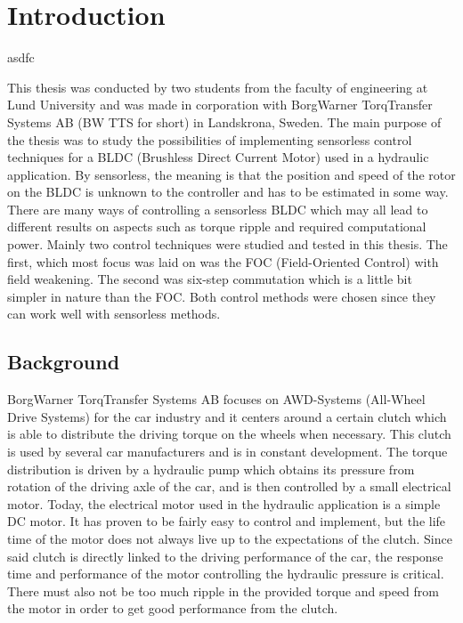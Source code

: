 \documentclass{LTHthesis}
\begin{document}
\chapter{Introduction}
asdfc

This thesis was conducted by two students from the faculty of engineering at Lund University and was made in corporation with BorgWarner TorqTransfer Systems AB (BW TTS for short) in Landskrona, Sweden. The main purpose of the thesis was to study the possibilities of implementing sensorless control techniques for a BLDC (Brushless Direct Current Motor) used in a hydraulic application. By sensorless, the meaning is that the position and speed of the rotor on the BLDC is unknown to the controller and has to be estimated in some way.
There are many ways of controlling a sensorless BLDC which may all lead to different results on aspects such as torque ripple and required computational power. Mainly two control techniques were studied and tested in this thesis. The first, which most focus was laid on was the FOC (Field-Oriented Control) with field weakening. The second was six-step commutation which is a little bit simpler in nature than the FOC. Both control methods were chosen since they can work well with sensorless methods.
\section{Background}
BorgWarner TorqTransfer Systems AB focuses on AWD-Systems (All-Wheel Drive Systems) for the car industry and it centers around a certain clutch which is able to distribute the driving torque on the wheels when necessary. This clutch is used by several car manufacturers and is in constant development. The torque distribution is driven by a hydraulic pump which obtains its pressure from rotation of the driving axle of the car, and is then controlled by a small electrical motor. Today, the electrical motor used in the hydraulic application is a simple DC motor. It has proven to be fairly easy to control and implement, but the life time of the motor does not always live up to the expectations of the clutch. Since said clutch is directly linked to the driving performance of the car, the response time and performance of the motor  controlling the hydraulic pressure is critical. There must also not be too much ripple in the provided torque and speed from the motor in order to get good performance from the clutch.
\end{document}

